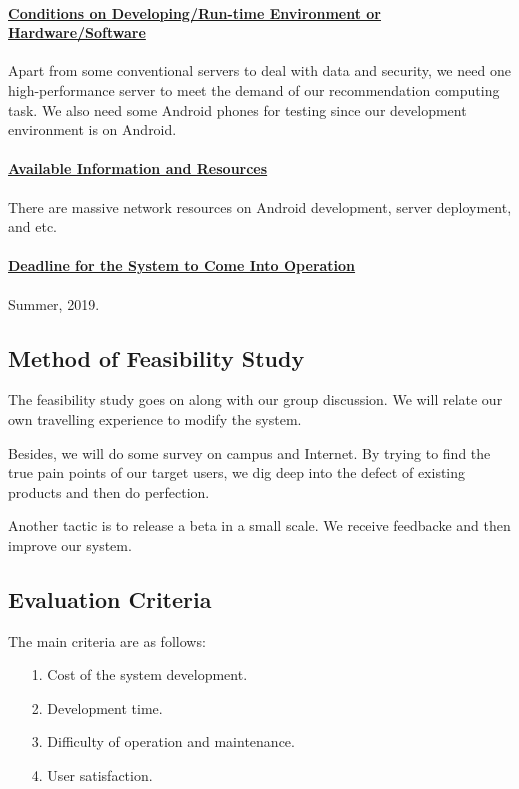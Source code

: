 \documentclass[10pt]{article}
\begin{document}
\paragraph{\underline{Conditions on Developing/Run-time Environment or Hardware/Software}}
Apart from some conventional servers to deal with data and security, we need one high-performance server to meet the demand of our recommendation computing task. We also need some Android phones for testing since our development environment is on Android.

\paragraph{\underline{Available Information and Resources}}
There are massive network resources on Android development, server deployment, and etc.

\paragraph{\underline{Deadline for the System to Come Into Operation}}
Summer, 2019.

\subsection{Method of Feasibility Study}
The feasibility study goes on along with our group discussion. We will relate our own travelling experience to modify the system. 

Besides, we will do some survey on campus and Internet. By trying to find the true pain points of our target users, we dig deep into the defect of existing products and then do perfection.

Another tactic is to release a beta in a small scale. We receive feedbacke and then improve our system.

\subsection{Evaluation Criteria}
The main criteria are as follows:

\begin{itemize}
  \item[1.] Cost of the system development.
  \item[2.] Development time.
  \item[3.] Difficulty of operation and maintenance.
  \item[4.] User satisfaction. 
\end{itemize}
\end{document}
